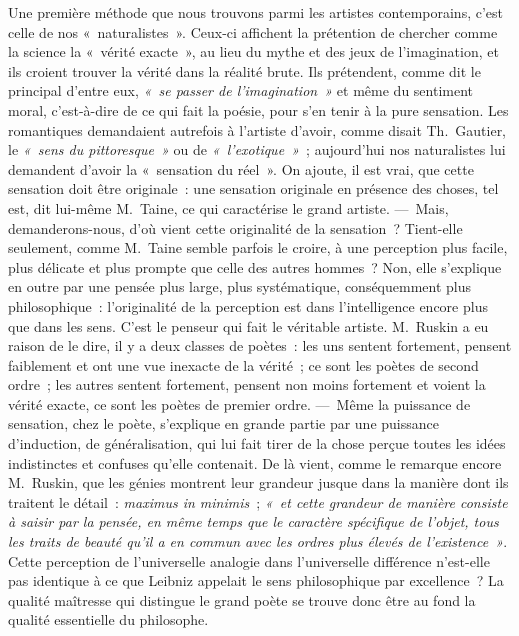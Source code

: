 \documentclass[french,twoside]{book} %
\newcommand\foreign[1]{\emph{#1}}
\begin{document}
Une première méthode que nous trouvons parmi les artistes contemporains, c’est celle de nos « naturalistes ». Ceux-ci affichent la prétention de chercher comme la science la « vérité exacte », au lieu du mythe et des jeux de l’imagination, et ils croient trouver la vérité dans la réalité brute. Ils prétendent, comme dit le principal d’entre eux, \emph{« se passer de l’imagination »} et même du sentiment moral, c’est-à-dire de ce qui fait la poésie, pour s’en tenir à la pure sensation. Les romantiques demandaient autrefois à l’artiste d’avoir, comme disait Th. Gautier, le \emph{« sens du pittoresque »} ou de \emph{« l’exotique »} ; aujourd’hui nos naturalistes lui demandent d’avoir la « sensation du réel ». On ajoute, il est vrai, que cette sensation doit être originale : une sensation originale en présence des choses, tel est, dit lui-même M. Taine, ce qui caractérise le grand artiste. — Mais, demanderons-nous, d’où vient cette originalité de la sensation ? Tient-elle seulement, comme M. Taine semble parfois le croire, à une perception plus facile, plus délicate et plus prompte que celle des autres hommes ? Non, elle s’explique en outre par une pensée plus large, plus systématique, conséquemment plus philosophique : l’originalité de la perception est dans l’intelligence encore plus que dans les sens. C’est le penseur qui fait le véritable artiste. M. Ruskin a eu raison de le dire, il y a deux classes de poètes : les uns sentent fortement, pensent faiblement et ont une vue inexacte de la vérité ; ce sont les poètes de  second ordre ; les autres sentent fortement, pensent non moins fortement et voient la vérité exacte, ce sont les poètes de premier ordre. — Même la puissance de sensation, chez le poète, s’explique en grande partie par une puissance d’induction, de généralisation, qui lui fait tirer de la chose perçue toutes les idées indistinctes et confuses qu’elle contenait. De là vient, comme le remarque encore M. Ruskin, que les génies montrent leur grandeur jusque dans la manière dont ils traitent le détail : \foreign{\emph{maximus in minimis}} ; \emph{« et cette grandeur de manière consiste à saisir par la pensée, en même temps que le caractère \emph{spécifique} de l’objet, tous les traits de beauté qu’il a \emph{en commun} avec les ordres plus élevés de l’existence »}. Cette perception de l’universelle analogie dans l’universelle différence n’est-elle pas identique à ce que Leibniz appelait le sens philosophique par excellence ? La qualité maîtresse qui distingue le grand poète se trouve donc être au fond la qualité essentielle du philosophe.\par
\end{document}
